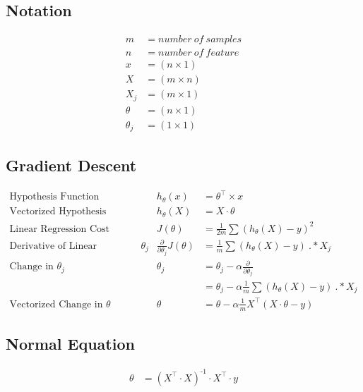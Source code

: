 \documentclass[11pt, oneside]{article}
\begin{document}
\subsection{Notation}
	\begin{align*}
		m &= number\ of\ samples\\
		n &= number\ of\ feature\\
		x &= (n \times 1)\\
		X &= (m \times n)\\
		X_j &= (m \times 1)\\
		\theta &= (n \times 1)\\
		\theta_j &= (1 \times 1)
	\end{align*}

\subsection{Gradient Descent}
	\begin{align*}
		\text{Hypothesis Function} && 
			h_\theta(x) &= \theta^\intercal \times x\\
		\text{Vectorized Hypothesis Function} && 
			h_\theta(X) &= X \cdot \theta \\
		\text{Linear Regression Cost Function} && 
			J(\theta) &= \frac{1}{2 m} \sum (h_\theta(X) - y)^2 \\
		\text{Derivative of Linear Regression CF wrt $\theta_j$} && 
			\frac{\partial}{\partial \theta_j} J(\theta) &= \frac{1}{m} \sum (h_\theta(X) - y)\ .* X_j \\
		\text{Change in $\theta_j$} &&
			\theta_j &= \theta_j - \alpha \frac{\partial}{\partial \theta_j} \\
		\text{} &&
			&= \theta_j - \alpha \frac{1}{m} \sum (h_\theta(X) - y)\ .* X_j \\
		\text{Vectorized Change in $\theta$} &&
			\theta &= \theta - \alpha \frac{1}{m} X^\intercal (X \cdot \theta - y) 
	\end{align*}

\subsection{Normal Equation}
	\begin{align*}
		\theta &= (X^\intercal \cdot X)^\text{-1} \cdot X^\intercal \cdot y
	\end{align*}

\newpage



\end{document}
